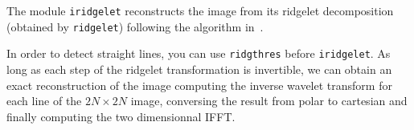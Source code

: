 The module {\tt iridgelet} reconstructs the image from its ridgelet decomposition (obtained by {\tt ridgelet}) following the algorithm 
in~\cite{starck.candes.ea:curvelet}.

In order to detect straight lines, you can use {\tt ridgthres} before {\tt iridgelet}.
As long as each step of the ridgelet transformation is invertible, we can obtain an exact reconstruction of the image computing the inverse wavelet transform for each line of the $2N \times 2N$ image, conversing the result from polar to cartesian and finally computing the two dimensionnal IFFT.
